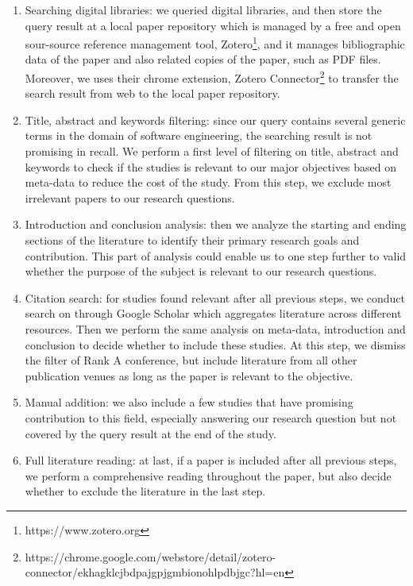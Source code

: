 \begin{enumerate}
\item Searching digital libraries: we queried digital libraries, and then store the query result at a local paper repository which is managed by a free and open sour-source reference management tool, Zotero\footnote{https://www.zotero.org}, and it manages bibliographic data of the paper and also related copies of the paper, such as PDF files. Moreover, we uses their chrome extension, Zotero Connector\footnote{https://chrome.google.com/webstore/detail/zotero-connector/ekhagklcjbdpajgpjgmbionohlpdbjgc?hl=en} to transfer the search result from web to the local paper repository.
\item Title, abstract and keywords filtering: since our query contains several generic terms in the domain of software engineering, the searching result is not promising in recall. We perform a first level of filtering on title, abstract and keywords to check if the studies is relevant to our major objectives based on meta-data to reduce the cost of the study. From this step, we exclude most irrelevant papers to our research questions.
\item Introduction and conclusion analysis: then we analyze the starting and ending sections of the literature to identify their primary research goals and contribution. This part of analysis could enable us to one step further to valid whether the purpose of the subject is relevant to our research questions.
\item Citation search: for studies found relevant after all previous steps, we conduct search on through Google Scholar which aggregates literature across different resources. Then we perform the same analysis on meta-data, introduction and conclusion to decide whether to include these studies. At this step, we dismiss the filter of Rank A conference, but include literature from all other publication venues as long as the paper is relevant to the objective.
\item Manual addition: we also include a few studies that have promising contribution to this field, especially answering our research question but not covered by the query result at the end of the study. 
\item Full literature reading: at last, if a paper is included after all previous steps, we perform a comprehensive reading throughout the paper, but also decide whether to exclude the literature in the last step.

\end{enumerate}

